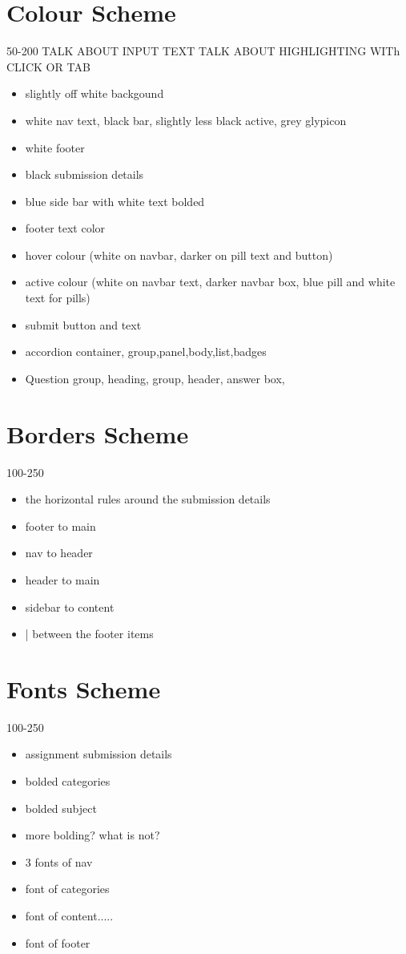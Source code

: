 \documentclass[10pt,a4paper]{article}
\begin{document}
\section{Colour Scheme}
	50-200
	TALK ABOUT INPUT TEXT
	TALK ABOUT HIGHLIGHTING WITh CLICK OR TAB
	\begin{itemize}
		\item slightly off white backgound
		\item white nav text, black bar, slightly less black active, grey glypicon
		\item white footer
		\item black submission details
		\item blue side bar with white text bolded
		\item footer text color
		\item hover colour (white on navbar, darker on pill text and button)
		\item active colour (white on navbar text, darker navbar box, blue pill and white text for pills)
		\item submit button and text
		\item accordion container, group,panel,body,list,badges
		\item Question group, heading, group, header, answer box, 
	\end{itemize}
\section{Borders Scheme}
	100-250
	\begin{itemize}
		\item the horizontal rules around the submission details
		\item footer to main
		\item nav to header
		\item header to main
		\item sidebar to content
		\item | between the footer items
	\end{itemize}
\section{Fonts Scheme}
	100-250
	\begin{itemize}
		\item assignment submission details
		\item bolded categories
		\item bolded subject
		\item more bolding? what is not?
		\item 3 fonts of nav
		\item font of categories
		\item font of content.....
		\item font of footer
	\end{itemize}
\end{document}
